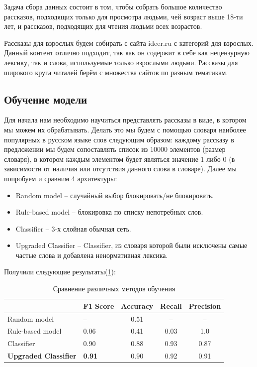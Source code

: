 \documentclass[14pt]{matmex-diploma}
\begin{document}
        Задача сбора данных состоит в том, чтобы собрать большое количество рассказов, подходящих
        только для просмотра людьми, чей возраст выше 18-ти лет, и рассказов, подходящих для чтения 
        людьми всех возрастов.
        
        Рассказы для взрослых будем собирать с сайта ideer.ru с категорий для взрослых. Данный контент отлично подходит,
        так как он содержит в себе как нецензурную лексику, так и слова, используемые только взрослыми людьми.
        Рассказы для широкого круга читалей берём с множества сайтов по разным тематикам.    
    
    \subsection{Обучение модели}
    
        Для начала нам необходимо научиться представлять рассказы в виде, в котором мы можем их обрабатывать.
        Делать это мы будем с помощью словаря наиболее популярных в русском языке слов следующим образом:
        каждому рассказу в предложении мы будем сопоставлять список из 10000 элементов (размер словаря), 
        в котором каждым элементом будет являться значение 1 либо 0 (в зависимости от наличия или отсутствия данного слова в словаре).
        Далее мы попробуем и сравним 4 архитектуры:
        
        \begin{itemize}
        	\item Random model – случайный выбор блокировать/не блокировать.
        	\item Rule-based model – блокировка по списку непотребных слов\cite{site:rule}.
        	\item Classifier – 3-х слойная обычная сеть.
        	\item Upgraded Classifier – Classifier, из словаря которой были исключены самые частые слова и добавлена ненормативная лексика.
        \end{itemize}
        
        Получили следующие результаты(\ref{graph}):
        
        \begin{table}[h]
            \centering
            \begin{tabular}{|l|l|c|c|c|}
            \hline
                                         & F1 Score      & Accuracy & Recall & Precision \\ \hline
            Random model                 & –             & 0.51     & –      & –         \\ \hline
            Rule-based model             & 0.06          & 0.41     & 0.03   & 1.0       \\ \hline
            Classifier                   & 0.90          & 0.88     & 0.93   & 0.87      \\ \hline
            \textbf{Upgraded Classifier} & \textbf{0.91} & 0.90     & 0.92   & 0.91      \\ \hline
            \end{tabular}
            \caption{Сравнение различных методов обучения}
            \label{graph}
        \end{table}
        
\end{document}
